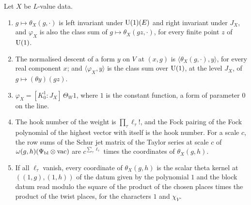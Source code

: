 \begin{lemma}\label{lem:character-kernel}
Let $X$ be $L$-value data.
\begin{enumerate}[label=\textup{(\alph*)}]
\item $g\mapsto\theta_X(g,\cdot)$ is left invariant under $\operatorname{U}(1)(E)$ and right invariant under $J_X$, and $\varphi_X$ is also the class sum of $g\mapsto\theta_X(gz,\cdot)$, for every finite point $z$ of $\operatorname{U}(1)$.
\item The normalised descent of a form $y$ on $V$ at $(x,g)$ is $\langle\theta_X(g,\cdot),y\rangle$, for every real component $x$; and $\langle\varphi_X,y\rangle$ is the class sum over $\operatorname{U}(1)$, at the level $J_X$, of $g\mapsto(\theta y)(gz)$.
\item $\varphi_X=[K_0^1:J_X]\,\Theta_W1$, where $1$ is the constant function, a form of parameter $0$ on the line.
\item The hook number of the weight is $\prod_\tau\ell_\tau!$, and the Fock pairing of the Fock polynomial of the highest vector with itself is the hook number. For a scale $c$, the row sums of the Schur jet matrix of the
Taylor series at scale $c$ of $\omega(g,h)(\Psi_{\rm bl}\otimes\mathrm{vac})$ are $c^{\sum_\tau\ell_\tau}$ times the coordinates of $\theta_X(g,h)$.
\item If all $\ell_\tau$ vanish, every coordinate of $\theta_X(g,h)$ is the scalar theta kernel at $((1,g),(1,h))$ of the datum given by the polynomial $1$ and the block datum read modulo the square of the product of the chosen places
times the product of the twist places, for the characters $1$ and $\chi_V$.
\end{enumerate}
\end{lemma}

